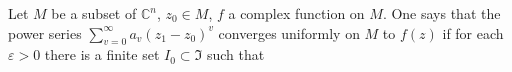 Let $M$ be a subset of $\mathbb{C}^n$, $z_0 \in M$, $f$ a complex function on $M$. One says that the power series $\sum_{v=0}^{\infty} a_v(z_1 - z_0)^v$ converges uniformly on $M$ to $f(z)$ if for each $\varepsilon > 0$ there is a finite set $I_0 \subset \Im$ such that
